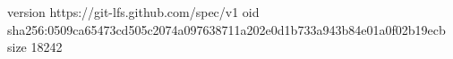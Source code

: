 version https://git-lfs.github.com/spec/v1
oid sha256:0509ca65473cd505c2074a097638711a202e0d1b733a943b84e01a0f02b19ecb
size 18242
